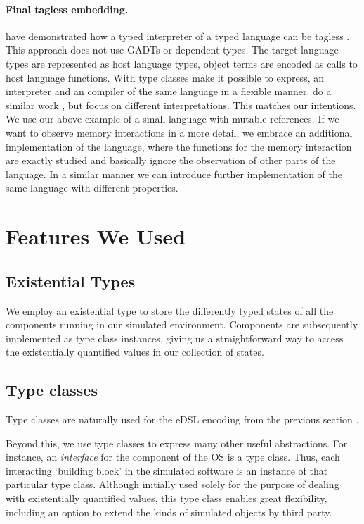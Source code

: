 \paragraph{Final tagless embedding.}
\citeauthor{final_tagless_embedding} have demonstrated how a typed interpreter of a typed language can be tagless \cite{final_tagless_embedding}.
This approach does not use GADTs or dependent types.
The target language types are represented as host language types, object terms are encoded as calls to host language functions. With type classes \citeauthor{final_tagless_embedding} make it possible to express, \eg an interpreter and an compiler of the same language in a flexible manner.
\citeauthor{Hofer:2008:PED:1449913.1449935} do a similar work \cite{Hofer:2008:PED:1449913.1449935}, but focus on different interpretations.
This matches our intentions.
We use our above example of a small language with mutable references.
If we want to observe memory interactions in a more detail, we embrace an additional implementation of the language, where the functions for the memory interaction are exactly studied and basically ignore the observation of other parts of the language.
In a similar manner we can introduce further implementation of the same language with different properties.

\section{Features We Used}
\label{sec:impl-detail}

\subsection{Existential Types}
We employ an existential type to store the differently typed states of all the components running in our simulated environment.
Components are subsequently implemented as type class instances, giving us a straightforward way to access the existentially quantified values in our collection of states.

\subsection{Type classes}
Type classes are naturally used for the eDSL encoding from the previous section \cite{Hall:1996:TCH:227699.227700,final_tagless_embedding}.

Beyond this, we use type classes to express many other useful abstractions.
For instance, an \emph{interface} for the component of the OS is a type class.
Thus, each interacting `building block' in the simulated software is an instance of that particular type class.
Although initially used solely for the purpose of dealing with existentially quantified values, this  type class enables great flexibility, including an option to extend the kinds of simulated objects by third party.


